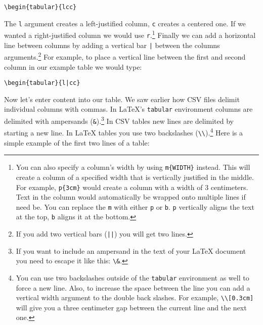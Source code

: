 \begin{knitrout}
\color{fgcolor}\begin{kframe}
\begin{alltt}
\textbackslash{}begin\{tabular\}\{l c c\}
\end{alltt}
\end{kframe}
\end{knitrout}


\noindent The \texttt{l} argument creates a left-justified column, \texttt{c} creates a centered one. If we wanted a right-justified column we would use \texttt{r}.\footnote{You can also specify a column's width by using \texttt{m\{WIDTH\}} instead. This will create a column of a specified width that is vertically justified in the middle. For example, \texttt{p\{3cm\}} would create a column with a width of 3 centimeters. Text in the column would automatically be wrapped onto multiple lines if need be. You can replace the \texttt{m} with either \texttt{p} or \texttt{b}. \texttt{p} vertically aligns the text at the top, \texttt{b} aligns it at the bottom.} Finally we can add a horizontal line between columns by adding a vertical bar \texttt{|} between the columns arguments.\footnote{If you add two vertical bars (\texttt{||}) you will get two lines.} For example, to place a vertical line between the first and second column in our example table we would type:

\begin{knitrout}
\color{fgcolor}\begin{kframe}
\begin{alltt}
\textbackslash{}begin\{tabular\}\{l | c c\}
\end{alltt}
\end{kframe}
\end{knitrout}


Now let's enter content into our table. We saw earlier how CSV files delimit individual columns with commas. In LaTeX's \texttt{tabular} environment columns are delimited with ampersands (\verb|&|).\footnote{If you want to include an ampersand in the text of your LaTeX document you need to escape it like this: \texttt{\textbackslash{}\&}.} In CSV tables new lines are delimited by starting a new line. In LaTeX tables you use two backslashes (\verb|\\|).\footnote{You can use two backslashes outside of the \texttt{tabular} environment as well to force a new line. Also, to increase the space between the line you can add a vertical width argument to the double back slashes. For example, \texttt{\textbackslash{}\textbackslash{}[0.3cm]} will give you a three centimeter gap between the current line and the next one.} Here is a simple example of the first two lines of a table:

